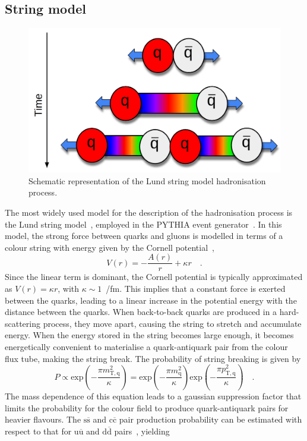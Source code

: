 \subsection{String model}
\begin{figure}[htb]
    \centering
    \includegraphics[width=0.7\linewidth]{Figures/Chapter 2/Lund.png}
    \caption{Schematic representation of the Lund string model hadronisation process.}
    \label{fig:Lund}
\end{figure}
The most widely used model for the description of the hadronisation process is the Lund string model~\cite{Andersson:1983ia}, employed in the PYTHIA event generator~\cite{Bierlich:2022pfr}. In this model, the strong force between quarks and gluons is modelled in terms of a colour string with energy given by the Cornell potential~\cite{Eichten:1974af},
\begin{equation*}
    V(r) = -\frac{A(r)}{r} + \kappa r\quad .
\end{equation*}
Since the linear term is dominant, the Cornell potential is typically approximated as $V(r) = \kappa r$, with $\kappa\sim1$~\gev/fm. This implies that a constant force is exerted between the quarks, leading to a linear increase in the potential energy with the distance between the quarks. When back-to-back quarks are produced in a hard-scattering process, they move apart, causing the string to stretch and accumulate energy. When the energy stored in the string becomes large enough, it becomes energetically convenient to materialise a quark-antiquark pair from the colour flux tube, making the string break. The probability of string breaking is given by
\begin{equation*}
    P \propto \mathrm{exp}\left(-\frac{\pi m_\mathrm{T,q}^2}{\kappa}\right) = \mathrm{exp}\left(-\frac{\pi m_\mathrm{q}^2}{\kappa}\right) \mathrm{exp}\left(-\frac{\pi p_\mathrm{T,q}^2}{\kappa}\right)\quad .
\end{equation*}
The mass dependence of this equation leads to a gaussian suppression factor that limits the probability for the colour field to produce quark-antiquark pairs for heavier flavours. The $\mathrm{s\overline{s}}$ and $\mathrm{c\overline{c}}$ pair production probability can be estimated with respect to that for $\mathrm{u\overline{u}}$ and $\mathrm{d\overline{d}}$ pairs~\cite{Ferreres-Sole:2018vgo}, yielding
